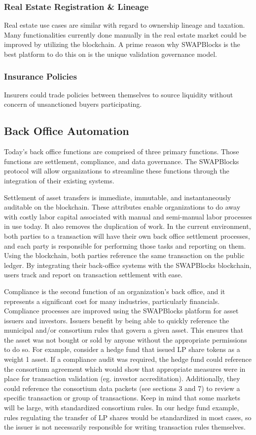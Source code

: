 \documentclass[12pt]{article}
\begin{document}
\subsubsection{Real Estate Registration \& Lineage}
Real estate use cases are similar with regard to ownership lineage and taxation. Many functionalities currently done manually in the real estate market could be improved by utilizing the blockchain. A prime reason why SWAPBlocks is the best platform to do this on is the unique validation governance model.

\subsubsection{Insurance Policies}
Insurers could trade policies between themselves to source liquidity without concern of unsanctioned buyers participating.


\subsection{Back Office Automation}
Today’s back office functions are comprised of three primary functions. Those functions are settlement, compliance, and data governance. The SWAPBlocks protocol will allow organizations to streamline these functions through the integration of their existing systems.

Settlement of asset transfers is immediate, immutable, and instantaneously auditable on the blockchain. These attributes enable organizations to do away with costly labor capital associated with manual and semi-manual labor processes in use today. It also removes the duplication of work. In the current environment, both parties to a transaction will have their own back office settlement processes, and each party is responsible for performing those tasks and reporting on them. Using the blockchain, both parties reference the same transaction on the public ledger. By integrating their back-office systems with the SWAPBlocks blockchain, users track and report on transaction settlement with ease.

Compliance is the second function of an organization’s back office, and it represents a significant cost for many industries, 
particularly financials. Compliance processes are improved using the SWAPBlocks platform for asset issuers and investors. 
Issuers benefit by being able to quickly reference the municipal and/or consortium rules that govern a given asset. This 
ensures that the asset was not bought or sold by anyone without the appropriate permissions to do so. For example, consider a 
hedge fund that issued LP share tokens as a weight 1 asset. If a compliance audit was required, the hedge fund could reference the 
consortium agreement which would show that appropriate measures were in place for transaction validation (eg. investor accreditation).
Additionally, they could reference 
the consortium data packets (see sections 3 and 7) to review a specific transaction or group of transactions. Keep in mind that some 
markets will be large, with standardized consortium rules. In our hedge fund example, rules regulating the transfer of LP shares would 
be standardized in most cases, so the issuer is not necessarily responsible for writing transaction rules themselves. 
\end{document}
